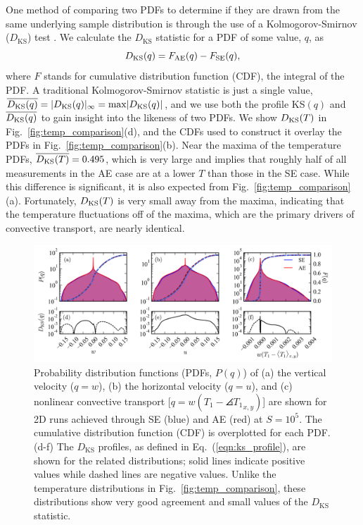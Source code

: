 One method of comparing two
PDFs to determine if they are drawn from the same underlying
sample distribution is through the use of a Kolmogorov-Smirnov ($D_{\text{KS}}$) test \cite{wall&jenkins2012}.
We calculate the $D_{\text{KS}}$ statistic for a PDF of some value, $q$, as
\begin{equation}
D_{\text{KS}}(q) = F_{\text{AE}}(q) - F_{\text{SE}}(q),
\label{eqn:ks_profile}
\end{equation}
where $F$ stands for cumulative distribution function (CDF), the integral of the PDF.
A traditional Kolmogorov-Smirnov statistic is just a single value,
$\overline{D_\text{KS}(q)} = |D_{\text{KS}}(q)|_\infty =
\text{max} |D_{\text{KS}}(q)|$, and we use both the profile KS$(q)$ and
$\overline{D_\text{KS}(q)}$ to gain insight into the likeness of two PDFs. 
We show $D_{\text{KS}}(T)$ in Fig.~\ref{fig:temp_comparison}(d), and the
CDFs used to construct it overlay the PDFs in Fig.~\ref{fig:temp_comparison}(b).
Near the maxima of the temperature PDFs, $\overline{D_\text{KS}(T)} = 0.495$, 
which is very large and implies that roughly half of all
measurements in the AE case are at a lower $T$ than those in the SE case.
While this difference is significant, it is also expected from Fig.~\ref{fig:temp_comparison}(a).
Fortunately, $D_{\text{KS}}(T)$ is very small away from the maxima, 
indicating that the temperature fluctuations off of the maxima, which are the primary
drivers of convective transport, are nearly identical.


\begin{figure}[bt!]
\includegraphics[width=\textwidth]{./figs/pdf_comparison.pdf}
\caption[Probability distribution comparison of AE and SE dynamics]{Probability distribution functions (PDFs, $P(q)$) of (a) the vertical velocity ($q = w$), (b) the horizontal velocity ($q = u$), and (c) nonlinear
convective transport [$q = w(T_1 - \angles{T_1}_{x,y})$] are shown for 2D runs achieved through SE (blue) and AE (red)
at $S = 10^{5}$.  The cumulative distribution function (CDF) is overplotted for each PDF. 
(d-f) The $D_{\text{KS}}$ profiles, as defined in Eq.~(\ref{eqn:ks_profile}),
are shown for the related distributions; solid lines indicate positive values
while dashed lines are negative values. Unlike the temperature distributions in
Fig.~\ref{fig:temp_comparison}, these distributions
show very good agreement and small values of the $D_{\text{KS}}$ statistic.
\label{fig:pdf_comparison} }
\end{figure}

